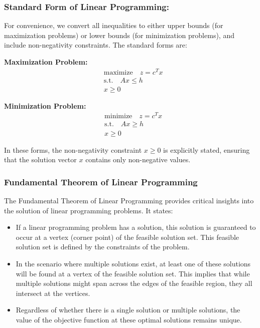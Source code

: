 \documentclass[unicode,11pt,a4paper,oneside,numbers=endperiod,openany]{scrartcl}
\begin{document}
\subsubsection{Standard Form of Linear Programming:}
For convenience, we convert all inequalities to either upper bounds (for maximization problems) or lower bounds (for minimization problems), and include non-negativity constraints. The standard forms are:

\textbf{Maximization Problem:}
\[
 \begin{aligned}
 &\text{maximize} \quad z = c^T x \\
 &\text{s.t.} \quad Ax \leq h \\
 &x \geq 0
 \end{aligned}
\]

\textbf{Minimization Problem:}
\[
 \begin{aligned}
 &\text{minimize} \quad z = c^T x \\
 &\text{s.t.} \quad Ax \geq h \\
 &x \geq 0
 \end{aligned}
\]

In these forms, the non-negativity constraint \( x \geq 0 \) is explicitly stated, ensuring that the solution vector \( x \) contains only non-negative values.

\subsubsection{Fundamental Theorem of Linear Programming}
The Fundamental Theorem of Linear Programming provides critical insights into the solution of linear programming problems. It states:

\begin{itemize}
    \item If a linear programming problem has a solution, this solution is guaranteed to occur at a vertex (corner point) of the feasible solution set. This feasible solution set is defined by the constraints of the problem.
    \item In the scenario where multiple solutions exist, at least one of these solutions will be found at a vertex of the feasible solution set. This implies that while multiple solutions might span across the edges of the feasible region, they all intersect at the vertices.
    \item Regardless of whether there is a single solution or multiple solutions, the value of the objective function at these optimal solutions remains unique.
\end{itemize}
\end{document}
